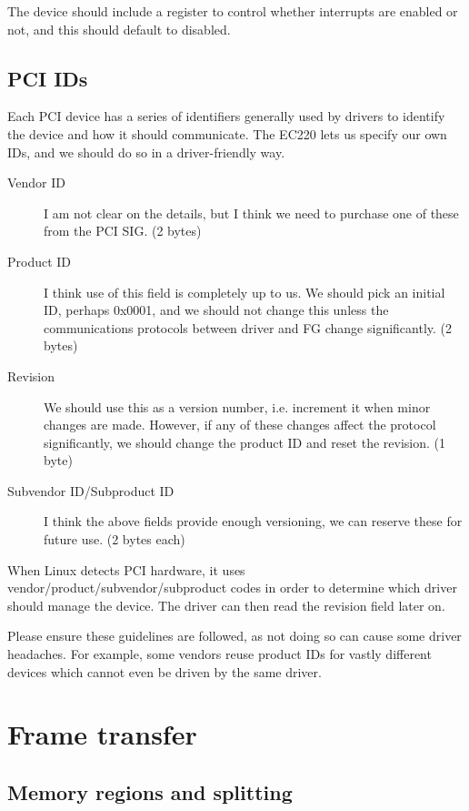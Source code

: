\documentclass[12pt]{article}
\begin{document}
The device should include a register to control whether interrupts are enabled or not, and this should default to disabled.

\subsection{PCI IDs}

Each PCI device has a series of identifiers generally used by drivers to identify the device and how it should communicate. The EC220 lets us specify our own IDs, and we should do so in a driver-friendly way.

\begin{description}
\item[Vendor ID] I am not clear on the details, but I think we need to purchase one of these from the PCI SIG. (2 bytes)
\item[Product ID] I think use of this field is completely up to us. We should pick an initial ID, perhaps 0x0001, and we should not change this unless the communications protocols between driver and FG change significantly. (2 bytes)
\item[Revision] We should use this as a version number, i.e. increment it when minor changes are made. However, if any of these changes affect the protocol significantly, we should change the product ID and reset the revision. (1 byte)
\item[Subvendor ID/Subproduct ID] I think the above fields provide enough versioning, we can reserve these for future use. (2 bytes each)
\end{description}

When Linux detects PCI hardware, it uses vendor/product/subvendor/subproduct codes in order to determine which driver should manage the device. The driver can then read the revision field later on.

Please ensure these guidelines are followed, as not doing so can cause some driver headaches. For example, some vendors reuse product IDs for vastly different devices which cannot even be driven by the same driver.

\section{Frame transfer}

\subsection{Memory regions and splitting}
\end{document}
